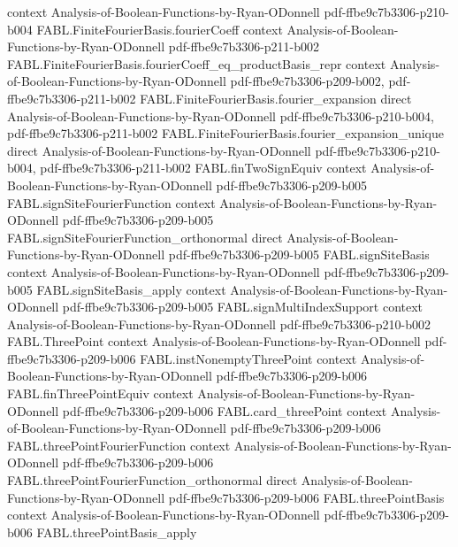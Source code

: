 \begin{theorem}
  {context}
  {Analysis-of-Boolean-Functions-by-Ryan-ODonnell}
  {pdf-ffbe9c7b3306-p210-b004}
\proofstep
  {FABL.FiniteFourierBasis.fourierCoeff}
  {context}
  {Analysis-of-Boolean-Functions-by-Ryan-ODonnell}
  {pdf-ffbe9c7b3306-p211-b002}
\proofstep
  {FABL.FiniteFourierBasis.fourierCoeff_eq_productBasis_repr}
  {context}
  {Analysis-of-Boolean-Functions-by-Ryan-ODonnell}
  {pdf-ffbe9c7b3306-p209-b002,
    pdf-ffbe9c7b3306-p211-b002}
\proofstep
  {FABL.FiniteFourierBasis.fourier_expansion}
  {direct}
  {Analysis-of-Boolean-Functions-by-Ryan-ODonnell}
  {pdf-ffbe9c7b3306-p210-b004,
    pdf-ffbe9c7b3306-p211-b002}
\proofstep
  {FABL.FiniteFourierBasis.fourier_expansion_unique}
  {direct}
  {Analysis-of-Boolean-Functions-by-Ryan-ODonnell}
  {pdf-ffbe9c7b3306-p210-b004,
    pdf-ffbe9c7b3306-p211-b002}
\proofstep
  {FABL.finTwoSignEquiv}
  {context}
  {Analysis-of-Boolean-Functions-by-Ryan-ODonnell}
  {pdf-ffbe9c7b3306-p209-b005}
\proofstep
  {FABL.signSiteFourierFunction}
  {context}
  {Analysis-of-Boolean-Functions-by-Ryan-ODonnell}
  {pdf-ffbe9c7b3306-p209-b005}
\proofstep
  {FABL.signSiteFourierFunction_orthonormal}
  {direct}
  {Analysis-of-Boolean-Functions-by-Ryan-ODonnell}
  {pdf-ffbe9c7b3306-p209-b005}
\proofstep
  {FABL.signSiteBasis}
  {context}
  {Analysis-of-Boolean-Functions-by-Ryan-ODonnell}
  {pdf-ffbe9c7b3306-p209-b005}
\proofstep
  {FABL.signSiteBasis_apply}
  {context}
  {Analysis-of-Boolean-Functions-by-Ryan-ODonnell}
  {pdf-ffbe9c7b3306-p209-b005}
\proofstep
  {FABL.signMultiIndexSupport}
  {context}
  {Analysis-of-Boolean-Functions-by-Ryan-ODonnell}
  {pdf-ffbe9c7b3306-p210-b002}
\proofstep
  {FABL.ThreePoint}
  {context}
  {Analysis-of-Boolean-Functions-by-Ryan-ODonnell}
  {pdf-ffbe9c7b3306-p209-b006}
\proofstep
  {FABL.instNonemptyThreePoint}
  {context}
  {Analysis-of-Boolean-Functions-by-Ryan-ODonnell}
  {pdf-ffbe9c7b3306-p209-b006}
\proofstep
  {FABL.finThreePointEquiv}
  {context}
  {Analysis-of-Boolean-Functions-by-Ryan-ODonnell}
  {pdf-ffbe9c7b3306-p209-b006}
\proofstep
  {FABL.card_threePoint}
  {context}
  {Analysis-of-Boolean-Functions-by-Ryan-ODonnell}
  {pdf-ffbe9c7b3306-p209-b006}
\proofstep
  {FABL.threePointFourierFunction}
  {context}
  {Analysis-of-Boolean-Functions-by-Ryan-ODonnell}
  {pdf-ffbe9c7b3306-p209-b006}
\proofstep
  {FABL.threePointFourierFunction_orthonormal}
  {direct}
  {Analysis-of-Boolean-Functions-by-Ryan-ODonnell}
  {pdf-ffbe9c7b3306-p209-b006}
\proofstep
  {FABL.threePointBasis}
  {context}
  {Analysis-of-Boolean-Functions-by-Ryan-ODonnell}
  {pdf-ffbe9c7b3306-p209-b006}
\proofstep
  {FABL.threePointBasis_apply}

\end{theorem}
